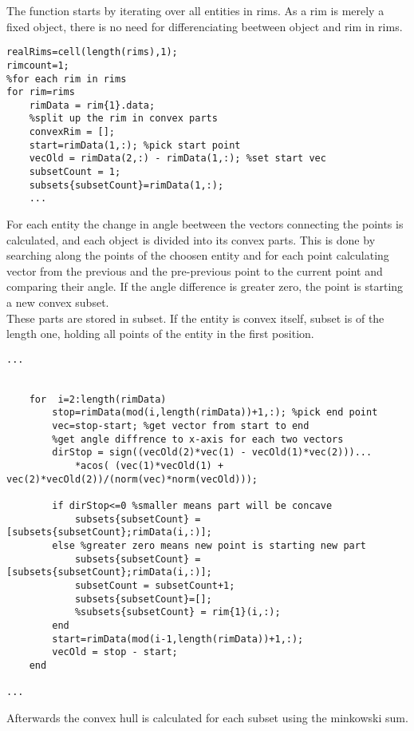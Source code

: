 The function starts by iterating over all entities in rims. As a rim is merely a fixed object, there is no need for differenciating beetween object and rim in rims.
\begin{lstlisting}
realRims=cell(length(rims),1);
rimcount=1;
%for each rim in rims
for rim=rims    
    rimData = rim{1}.data;
    %split up the rim in convex parts
    convexRim = [];
    start=rimData(1,:); %pick start point
    vecOld = rimData(2,:) - rimData(1,:); %set start vec
    subsetCount = 1;
    subsets{subsetCount}=rimData(1,:);
    ...
\end{lstlisting}
For each entity the change in angle beetween the vectors connecting the points is calculated, and each object is divided into its convex parts. This is done by     searching along the points of the choosen entity and for each point calculating vector from the previous and the pre-previous point to the current point and comparing their angle. If the angle difference is greater zero, the point is starting a new convex subset. \\
These parts are stored in subset. If the entity is convex itself, subset is of the length one, holding all points of the entity in the first position.
\begin{lstlisting}
...


    for  i=2:length(rimData)
        stop=rimData(mod(i,length(rimData))+1,:); %pick end point
        vec=stop-start; %get vector from start to end
        %get angle diffrence to x-axis for each two vectors
        dirStop = sign((vecOld(2)*vec(1) - vecOld(1)*vec(2)))...
            *acos( (vec(1)*vecOld(1) + vec(2)*vecOld(2))/(norm(vec)*norm(vecOld)));

        if dirStop<=0 %smaller means part will be concave
            subsets{subsetCount} = [subsets{subsetCount};rimData(i,:)];
        else %greater zero means new point is starting new part
            subsets{subsetCount} = [subsets{subsetCount};rimData(i,:)];
            subsetCount = subsetCount+1;
            subsets{subsetCount}=[];
            %subsets{subsetCount} = rim{1}(i,:);
        end
        start=rimData(mod(i-1,length(rimData))+1,:);
        vecOld = stop - start;
    end
 
...
\end{lstlisting}
Afterwards the convex hull is calculated for each subset using the minkowski sum.
